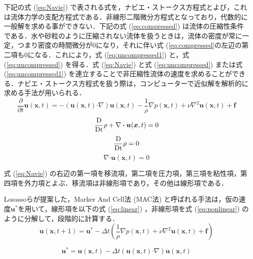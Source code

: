 \documentclass[a4j,12pt]{jreport}
\begin{document}
下記の式 (\ref{eq:Navie}) で表される式を，ナビエ・ストークス方程式とよび，これは流体力学の支配方程式である．非線形二階微分方程式となっており，代数的に一般解を求める事ができない．下記の式 (\ref{eq:compressed}) は流体の圧縮性条件である．水や砂粒のように圧縮されない流体を扱うときは，流体の密度が常に一定，つまり密度の時間微分が0になり，それに伴い式 (\ref{eq:compressed}の左辺の第二項も0になる．これにより，式 (\ref{eq:uncompressed1}) と，式 (\ref{eq:uncompressed}) を得る．式 (\ref{eq:Navie}) と式 (\ref{eq:uncompressed}) または式 (\ref{eq:uncompressed1}) を連立することで非圧縮性流体の速度を求めることができる．ナビエ・ストークス方程式を扱う際は，コンピューターで近似解を解析的に求める手法が用いられる．
\begin{equation}\label{eq:Navie}
\frac{\partial}{\partial t}\bm{u} (\bm{x},t)  = - (\bm{u} (\bm{x},t)  \boldsymbol{\cdot}\nabla) \bm{u} (\bm{x},t)   - \frac{1}{\rho}\nabla p (\bm{x},t)  + \nu\nabla^2\bm{u} (\bm{x},t)  + \bm{f}
\end{equation}
\begin{equation}\label{eq:compressed}
\frac{\rm{D}}{\rm{Dt}}\rho + \nabla\boldsymbol{\cdot}\bm{u} (\bm{x},t)  = 0
\end{equation}
\begin{equation}\label{eq:uncompressed1}
\frac{\rm{D}}{\rm{Dt}}\rho  = 0
\end{equation}
\begin{equation}\label{eq:uncompressed}
\nabla\boldsymbol{\cdot}\bm{u} (\bm{x},t)  = 0
\end{equation}

式 (\ref{eq:Navie}) の右辺の第一項を移流項，第二項を圧力項，第三項を粘性項，第四項を外力項とよぶ．移流項は非線形項であり，その他は線形項である．

Losassoらが提案した，Marker And Cell法 (MAC法) \cite{MAC}と呼ばれる手法は，仮の速度$\bm{u}^*$を用いて，線形項を以下の式 (\ref{eq:linear}) ，非線形項を式 (\ref{eq:nonlinear}) のように分解して，段階的に計算する．
\begin{equation}\label{eq:linear}
\bm{u} (\bm{x},t+1)  =  \bm{u}^* - \varDelta t (\frac{1}{\rho}\nabla p (\bm{x},t)  + \nu\nabla^2\bm{u} (\bm{x},t)  + \bm{f}) 
\end{equation} 

\begin{equation}\label{eq:nonlinear}
\bm{u}^* = \bm{u} (\bm{x},t)  - \varDelta t (\bm{u} (\bm{x},t)  \boldsymbol{\cdot}\nabla) \bm{u} (\bm{x},t)  
\end{equation}
\end{document}
